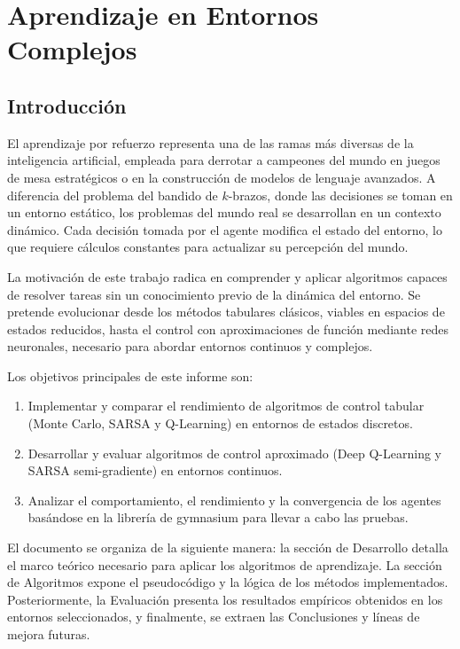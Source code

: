 
\chapter{Aprendizaje en Entornos Complejos}

\section{Introducción}

El aprendizaje por refuerzo representa una de las ramas más diversas de la inteligencia artificial, empleada para derrotar a campeones del mundo en juegos de mesa estratégicos o en la construcción de modelos de lenguaje avanzados. 
A diferencia del problema del bandido de $k$-brazos, donde las decisiones se toman en un entorno estático, los problemas del mundo real se desarrollan en un contexto dinámico. Cada decisión tomada por el agente modifica el estado del entorno, lo que requiere cálculos constantes para actualizar su percepción del mundo.

La motivación de este trabajo radica en comprender y aplicar algoritmos capaces de resolver tareas sin un conocimiento previo de la dinámica del entorno. Se pretende evolucionar desde los métodos tabulares clásicos, viables en espacios de estados reducidos, hasta el control con aproximaciones de función mediante redes neuronales, necesario para abordar entornos continuos y complejos.

Los objetivos principales de este informe son:
\begin{enumerate}
    \item Implementar y comparar el rendimiento de algoritmos de control tabular (Monte Carlo, SARSA y Q-Learning) en entornos de estados discretos.
    \item Desarrollar y evaluar algoritmos de control aproximado (Deep Q-Learning y SARSA semi-gradiente) en entornos continuos.
    \item Analizar el comportamiento, el rendimiento y la convergencia de los agentes basándose en la librería de gymnasium \cite{gymnasium} para llevar a cabo las pruebas.
\end{enumerate}

El documento se organiza de la siguiente manera: la sección de Desarrollo detalla el marco teórico necesario para aplicar los algoritmos de aprendizaje. La sección de Algoritmos expone el pseudocódigo y la lógica de los métodos implementados. Posteriormente, la Evaluación presenta los resultados empíricos obtenidos en los entornos seleccionados, y finalmente, se extraen las Conclusiones y líneas de mejora futuras.

